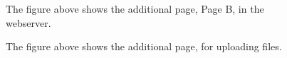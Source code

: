      \begin{figure}[!htbp]
  \caption{The figure above shows the additional page, Page B, in the webserver.}
\end{figure}
     \begin{figure}[!htbp]
  \caption{The figure above shows the additional page, for uploading files.}
\end{figure}
